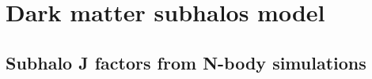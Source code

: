 \documentclass[12pt, a4paper]{article}
\newcommand{\red}[1]{\textcolor{red}{#1}}
\newcommand{\aure}[1]{\textcolor{orange}{[AA: #1]}}
\begin{document}

\section{Dark matter subhalos model}
\label{sec:DM_model}

\subsection{Subhalo J factors from N-body simulations}
\label{sec:sim-jfactor}
\end{document}
